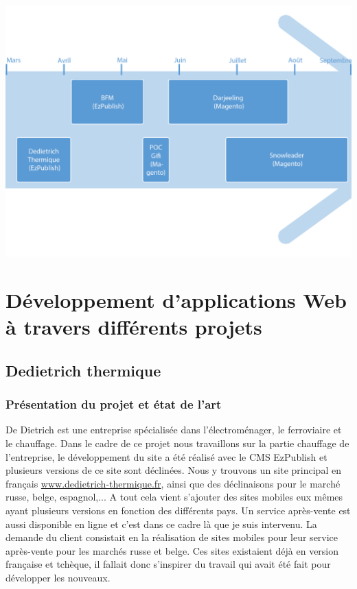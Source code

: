 \documentclass[a4paper,11pt,twoside]{report}
\begin{document}
  \begin{center}
	  \includegraphics[width=\textwidth]{images/frise_small.png} 
	  \label{frise_small}
  \end{center}
  
\chapter{Développement d'applications Web à travers différents projets}
  \section{Dedietrich thermique}
    \subsection*{Présentation du projet et état de l'art}
    De Dietrich est une entreprise spécialisée dans l'électroménager, le ferroviaire et le chauffage. Dans le cadre de ce projet nous travaillons sur la partie chauffage de l'entreprise, le développement du site a été réalisé avec le CMS EzPublish et plusieurs versions de ce site sont déclinées. Nous y trouvons un site principal en français \url{www.dedietrich-thermique.fr}, ainsi que des déclinaisons pour le marché russe, belge, espagnol,... A tout cela vient s'ajouter des sites mobiles eux mêmes ayant plusieurs versions en fonction des différents pays. Un service après-vente est aussi disponible en ligne et c'est dans ce cadre là que je suis intervenu. La demande du client consistait en la réalisation de sites mobiles pour leur service après-vente pour les marchés russe et belge. Ces sites existaient déjà en version française et tchèque, il fallait donc s'inspirer du travail qui avait été fait pour développer les nouveaux. 
\end{document}
